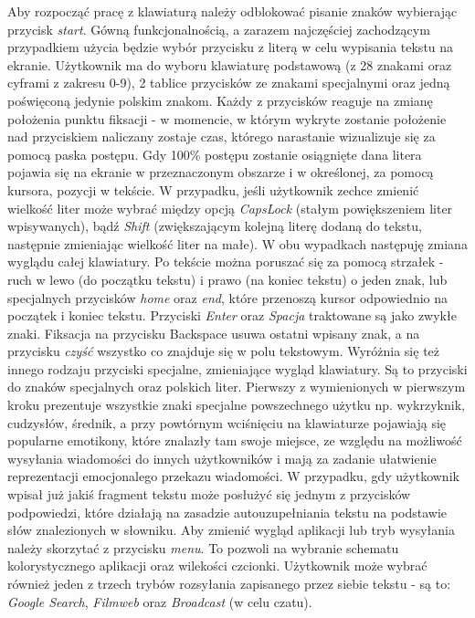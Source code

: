 \documentclass[twoside,a4paper]{book}
\begin{document}
Aby rozpocząć pracę z klawiaturą należy odblokować pisanie znaków wy\-bie\-ra\-jąc przycisk \textit{start}. Gówną funkcjonalnością, a zarazem najczęściej zachodzącym przypadkiem użycia będzie wybór przycisku z literą w celu wypisania tekstu na ekranie. Użytkownik ma do wyboru klawiaturę podstawową (z 28 znakami oraz cyframi z zakresu 0-9), 2 tablice przycisków ze znakami specjalnymi oraz jedną poświęconą jedynie polskim znakom. Każdy z przycisków reaguje na zmianę położenia punktu fiksacji - w momencie, w którym wykryte zostanie położenie nad przyciskiem naliczany zostaje czas, którego narastanie wizualizuje się za pomocą paska postępu. Gdy 100\% postępu zostanie osiągnięte dana litera pojawia się na ekranie w przeznaczonym obszarze i w określonej, za pomocą kursora, pozycji w tekście. W przypadku, jeśli użytkownik zechce zmienić wielkość liter może wybrać między opcją \textit{CapsLock} (stałym powiększeniem liter wpisywanych), bądź \textit{Shift} (zwiększającym kolejną literę dodaną do tekstu, następnie zmieniając wielkość liter na małe). W obu wypadkach następuję zmiana wyglądu całej klawiatury. 
Po tekście można poruszać się za pomocą strzałek - ruch w lewo (do początku tekstu) i prawo (na koniec tekstu) o jeden znak, lub specjalnych przycisków \textit{home} oraz \textit{end}, które przenoszą kursor odpowiednio na początek i koniec tekstu. Przyciski \textit{Enter} oraz \textit{Spacja} traktowane są jako zwykłe znaki. Fiksacja na przycisku Backspace usuwa ostatni wpisany znak, a na przycisku \textit{czyść} wszystko co znajduje się w polu tekstowym. Wyróżnia się też innego rodzaju przyciski specjalne, zmieniające wygląd klawiatury. Są to przyciski do znaków specjalnych oraz polskich liter. Pierwszy z wymienionych w pierwszym kroku prezentuje wszystkie znaki specjalne powszechnego użytku np. wykrzyknik, cudzysłów, średnik, a przy powtórnym wciśnięciu na klawiaturze pojawiają się popularne emotikony, które znalazły tam swoje miejsce, ze względu na możliwość wysyłania wiadomości do innych użytkowników i mają za zadanie ułatwienie reprezentacji emocjonalego przekazu wiadomości. W przypadku, gdy użytkownik wpisał już jakiś fragment tekstu może posłużyć się jednym z przycisków podpowiedzi, które działają na zasadzie autouzupełniania tekstu na podstawie słów znalezionych w słowniku. Aby zmienić wygląd aplikacji lub tryb wysyłania należy skorzytać z przycisku \textit{menu}. To pozwoli na wybranie schematu kolorystycznego aplikacji oraz wilekości czcionki. Użytkownik może wybrać również jeden z trzech trybów rozsyłania zapisanego przez siebie tekstu - są to: \textit{Google Search}, \textit{Filmweb} oraz \textit{Broadcast} (w celu czatu).
\end{document}

